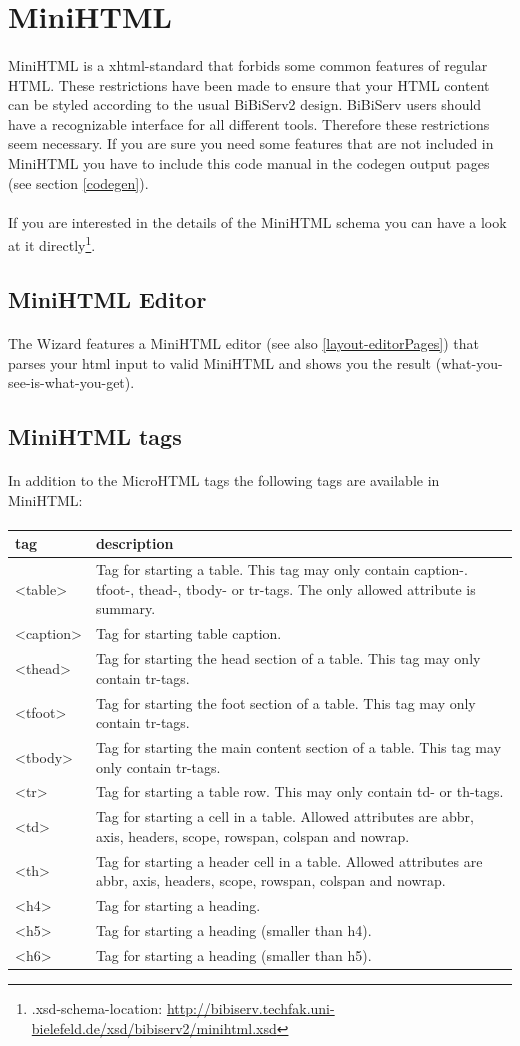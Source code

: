 \documentclass[a4paper,10pt]{book}
\newcommand{\htmlstandardI}[2]{
\paragraph{} #1 is a xhtml-standard that forbids some common features of regular HTML. These restrictions have been made to ensure that your HTML content can be styled according to the usual BiBiServ2 design. BiBiServ users should have a recognizable interface for all different tools. Therefore these restrictions seem necessary. If you are sure you need some features that are not included in #1 you have to include this code manual in the codegen output pages (see section \ref{codegen}).
\paragraph{} If you are interested in the details of the #1 schema you can have a look at it directly\footnote{.xsd-schema-location: \url{#2}}.
}
\newcommand{\htmlstandardII}[1]{
\paragraph{} The Wizard features a #1 editor (see also \ref{layout-editorPages}) that parses your html input to valid #1 and shows you the result (what-you-see-is-what-you-get).
}
\newcommand{\htmlTag}[1]{\textless #1\textgreater}
\begin{document}
\section{MiniHTML}
\label{minihtml}
\htmlstandardI{MiniHTML}{http://bibiserv.techfak.uni-bielefeld.de/xsd/bibiserv2/minihtml.xsd}
\subsection{MiniHTML Editor}
\htmlstandardII{MiniHTML}
\subsection{MiniHTML tags}
\paragraph{} In addition to the MicroHTML tags the following tags are available in MiniHTML:
\paragraph{}
\begin{tabularx}{\textwidth}{lX}
\hline
\textbf{tag} & \textbf{description}\\
\hline
\htmlTag{table}& Tag for starting a table. This tag may only contain caption-. tfoot-, thead-, tbody- or tr-tags. The only allowed attribute is summary.\\ [0.1cm]
\hline
\htmlTag{caption} & Tag for starting table caption.\\ [0.1cm]
\hline
\htmlTag{thead} & Tag for starting the head section of a table. This tag may only contain tr-tags.\\ [0.1cm]
\hline
\htmlTag{tfoot} & Tag for starting the foot section of a table. This tag may only contain tr-tags.\\ [0.1cm]
\hline
\htmlTag{tbody} & Tag for starting the main content section of a table. This tag may only contain tr-tags.\\ [0.1cm]
\hline
\htmlTag{tr} & Tag for starting a table row. This may only contain td- or th-tags.\\ [0.1cm]
\hline
\htmlTag{td} & Tag for starting a cell in a table. Allowed attributes are abbr, axis, headers, scope, rowspan, colspan and nowrap.\\ [0.1cm]
\hline
\htmlTag{th} & Tag for starting a header cell in a table. Allowed attributes are abbr, axis, headers, scope, rowspan, colspan and nowrap.\\ [0.1cm]
\hline
\htmlTag{h4} & Tag for starting a heading.\\ [0.1cm]
\hline
\htmlTag{h5} & Tag for starting a heading (smaller than h4).\\ [0.1cm]
\hline
\htmlTag{h6} & Tag for starting a heading (smaller than h5).\\ [0.1cm]
\end{tabularx}
\end{document}
